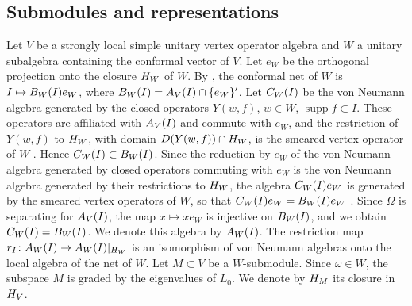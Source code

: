 \documentclass[leqno]{article}
\let\cal\relax
\newcommand{\cal}{\mathcal}
\newcommand{\co}{\colon}
\numberwithin{equation}{section}
\begin{document}
\subsection{Submodules and representations}
\label{subsec:submodules}

Let $V$ be a strongly local simple unitary vertex operator algebra and $W$ a unitary subalgebra containing the conformal vector of $V$. Let $e_W$ be the orthogonal projection onto the closure $\cal H_W$ of $W$. By \cite[Theorem 7.1 p.~55]{CKLW18}, the conformal net of $W$ is $I \mapsto \cal B_W(I)e_W$, where $\cal B_W(I) = \cal A_V(I) \cap \{e_W\}'$. Let $\cal C_W(I)$ be the von Neumann algebra generated by the closed operators $Y(w,f)$, $w \in W$, $\operatorname{supp} f \subset I$. These operators are affiliated with $\cal A_V(I)$ and commute with $e_W$, and the restriction of $Y(w,f)$ to $\cal H_W$, with domain $D(Y(w,f)) \cap \cal H_W$, is the smeared vertex operator of $W$ \cite[proof of Theorem 7.1 p.~55]{CKLW18}. Hence $\cal C_W(I) \subset \cal B_W(I)$. Since the reduction by $e_W$ of the von Neumann algebra generated by closed operators commuting with $e_W$ is the von Neumann algebra generated by their restrictions to $\cal H_W$, the algebra $\cal C_W(I)e_W$ is generated by the smeared vertex operators of $W$, so that $\cal C_W(I)e_W = \cal B_W(I)e_W$ \cite[Theorem 7.1 p.~55]{CKLW18}. Since $\Omega$ is separating for $\cal A_V(I)$, the map $x \mapsto xe_W$ is injective on $\cal B_W(I)$, and we obtain $\cal C_W(I) = \cal B_W(I)$. We denote this algebra by $\cal A_W(I)$. The restriction map $r_I \co \cal A_W(I) \to \cal A_W(I)|_{\cal H_W}$ is an isomorphism of von Neumann algebras onto the local algebra of the net of $W$. Let $M \subset V$ be a $W$-submodule. Since $\omega \in W$, the subspace $M$ is graded by the eigenvalues of $L_0$. We denote by $\cal H_M$ its closure in $\cal H_V$.
\end{document}
